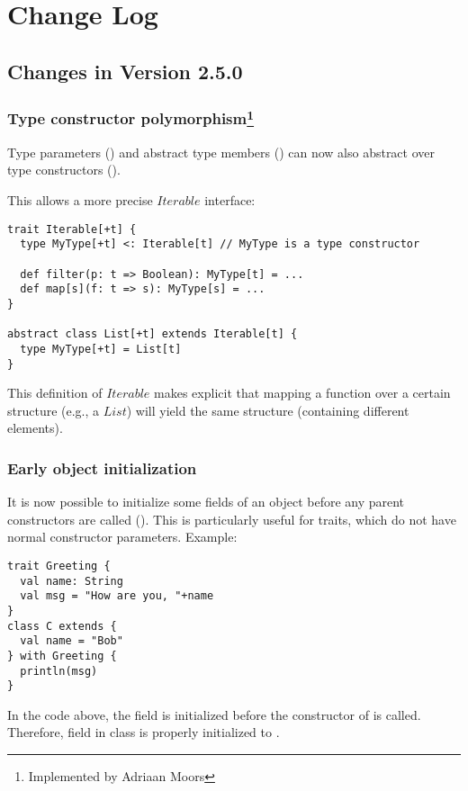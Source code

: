 
\chapter{Change Log}

\section*{Changes in Version 2.5.0}

\subsection*{Type constructor polymorphism\footnote{Implemented by Adriaan Moors}}
Type parameters () and abstract type members () can now also abstract over type constructors ().

This allows a more precise $Iterable$ interface:
\begin{lstlisting}
trait Iterable[+t] {
  type MyType[+t] <: Iterable[t] // MyType is a type constructor
                
  def filter(p: t => Boolean): MyType[t] = ...
  def map[s](f: t => s): MyType[s] = ...
}

abstract class List[+t] extends Iterable[t] {
  type MyType[+t] = List[t]
}
\end{lstlisting}

This definition of $Iterable$ makes explicit that mapping a function over a certain structure (e.g., a $List$) will yield the same structure (containing different elements).

\subsection*{Early object initialization}

It is now possible to initialize some fields of an object before any
parent constructors are called (). This is particularly useful for
traits, which do not have normal constructor parameters. Example:
\begin{lstlisting}
trait Greeting {
  val name: String
  val msg = "How are you, "+name
}
class C extends {
  val name = "Bob"
} with Greeting {
  println(msg)
}
\end{lstlisting}
In the code above, the field  is initialized before the
constructor of  is called. Therefore, field \lstinline@msg@ in
class  is properly initialized to .

